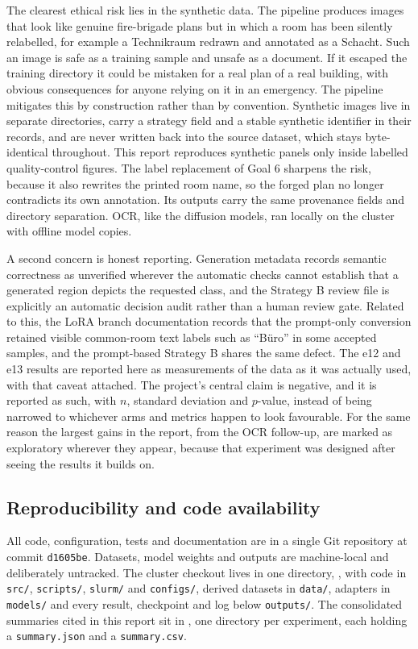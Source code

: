 The clearest ethical risk lies in the synthetic data. The pipeline produces
images that look like genuine fire-brigade plans but in which a room has been
silently relabelled, for example a Technikraum redrawn and annotated as a
Schacht. Such an image is safe as a training sample and unsafe as a document. If
it escaped the training directory it could be mistaken for a real plan of a real
building, with obvious consequences for anyone relying on it in an emergency.
The pipeline mitigates this by construction rather than by convention. Synthetic
images live in separate directories, carry a strategy field and a stable
synthetic identifier in their records, and are never written back into the
source dataset, which stays byte-identical throughout. This report reproduces
synthetic panels only inside labelled quality-control figures. The label
replacement of Goal 6 sharpens the risk, because it also rewrites the printed
room name, so the forged plan no longer contradicts its own annotation. Its
outputs carry the same provenance fields and directory separation. OCR, like
the diffusion models, ran locally on the cluster with offline model copies.

A second concern is honest reporting. Generation metadata records semantic
correctness as unverified wherever the automatic checks cannot establish that a
generated region depicts the requested class, and the Strategy B review file is
explicitly an automatic decision audit rather than a human review gate. Related
to this, the LoRA branch documentation records that the prompt-only conversion
retained visible common-room text labels such as ``B\"uro'' in some accepted samples, and the prompt-based Strategy B shares the same defect. The e12 and e13 results are reported here as measurements of the data
as it was actually used, with that caveat attached.
The project's central claim is negative, and it is reported as such, with $n$,
standard deviation and $p$-value, instead of being narrowed to whichever arms
and metrics happen to look favourable. For the same reason the largest gains in
the report, from the OCR follow-up, are marked as exploratory wherever they
appear, because that experiment was designed after seeing the results it
builds on.

\subsection{Reproducibility and code availability}

All code, configuration, tests and documentation are in a single Git repository
at commit \texttt{d1605be}. Datasets, model weights and outputs are
machine-local and deliberately untracked. The cluster checkout lives in one
directory, \protect{}, with
code in \texttt{src/}, \texttt{scripts/}, \texttt{slurm/} and
\texttt{configs/}, derived datasets in \texttt{data/}, adapters in
\texttt{models/} and every result, checkpoint and log below \texttt{outputs/}.
The consolidated summaries cited in this report sit in
\protect{}, one directory per experiment, each holding a
\texttt{summary.json} and a \texttt{summary.csv}.

